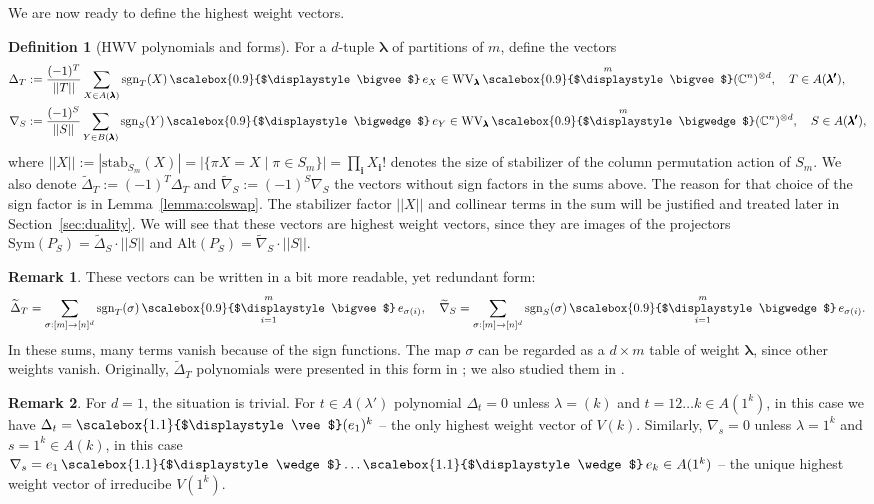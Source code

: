 \documentclass[12pt, reqno]{amsart}
\theoremstyle{definition}
\newtheorem{definition}[theorem]{Definition}
\newtheorem{remark}{Remark}[section]
\newcommand{\sgn}{\mathrm{sgn}}
\newcommand{\Deltaw}{\widetilde{\Delta}}
\newcommand{\nablaw}{\widetilde{\nabla}}
\let\oldbigwedge\bigwedge
\let\oldbigvee\bigvee
\let\oldwedge\wedge
\let\oldvee\vee
\renewcommand{\bigwedge}{
  \mathop{
    \vcenter{
      \hbox{\scalebox{0.9}{$\displaystyle\oldbigwedge$}}
    }
  }
}
\renewcommand{\bigvee}{
  \mathop{
    \vcenter{
      \hbox{\scalebox{0.9}{$\displaystyle\oldbigvee$}}
    }
  }
}
\renewcommand{\wedge}{
  \mathop{
    \vcenter{
      \hbox{\scalebox{1.1}{$\displaystyle\oldwedge$}}
    }
  }
}
\renewcommand{\vee}{
  \mathop{
    \vcenter{
      \hbox{\scalebox{1.1}{$\displaystyle\oldvee$}}
    }
  }
}
\begin{document}
We are now ready to define the highest weight vectors.

\begin{definition}[HWV polynomials and forms]\label{def:nabla-delta1}
    For a $d$-tuple $\pmb{\lambda}$ of partitions of $m$,
    define the vectors
    \begin{align} 
        \Delta_T &:= \frac{(-1)^T}{||T||}\sum_{X \in A(\pmb{\lambda})} \sgn_T(X) \bigvee e_X
        \in \mathrm{WV}_{\pmb{\lambda}} \bigvee^m (\mathbb{C}^n)^{\otimes d}, \quad T \in A(\pmb{\lambda'}), \label{eq:def-delta}
        \\  
        \nabla_S &:= \frac{(-1)^S}{||S||}\sum_{Y \in B(\pmb{\lambda})} \sgn_S(Y) \bigwedge e_Y 
        \in \mathrm{WV}_{\pmb{\lambda}} \bigwedge^m (\mathbb{C}^n)^{\otimes d}, \quad S \in A(\pmb{\lambda'}) \label{eq:def-nabla},
    \end{align}
    where $||X||:=|\mathrm{stab}_{S_m}(X)| = |\{\pi X = X \mid \pi \in S_m\}| = \prod_{\mathbf{i}}X_{\mathbf{i}}!$ denotes the size of stabilizer of the column permutation action of $S_m$.
    We also denote $\Deltaw_T := (-1)^T \Delta_T$ and $\nablaw_S := (-1)^S \nabla_S$ the vectors without sign factors in the sums above. The reason for that choice of the sign factor is in  Lemma~\ref{lemma:colswap}.
    The stabilizer factor $||X||$ and collinear terms in the sum will be justified and treated later in Section~\ref{sec:duality}.
    We will see that these vectors are highest weight vectors, since they are images of the projectors $\mathrm{Sym}(P_S) = \Deltaw_S \cdot ||S||$ and $\mathrm{Alt}(P_S) = \nablaw_S \cdot ||S||$.
\end{definition}
\begin{remark}
    These vectors can be written in a bit more readable, yet redundant form:
    \begin{align*}
        \Deltaw_T = \sum_{\sigma: [m] \to [n]^d} \sgn_T(\sigma) \bigvee_{i=1}^m e_{\sigma(i)}, 
        \quad 
        \nablaw_S = \sum_{\sigma: [m] \to [n]^d} \sgn_S(\sigma) \bigwedge_{i=1}^m e_{\sigma(i)}.
    \end{align*}
    In these sums, many terms vanish because of the sign functions. The map $\sigma$ can be regarded as a $d \times m$ table of weight $\pmb{\lambda}$, since other weights vanish. Originally, $\Deltaw_T$ polynomials were presented in this form in \cite{widg1}; we also studied them in \cite{ayfund}. 
\end{remark}
\begin{remark}
    For $d = 1$, the situation is trivial. For $t \in A(\lambda')$ polynomial $\Delta_{t} = 0$ unless $\lambda = (k)$ and $t = 12\ldots k \in A(1^k)$, in this case we have $\Delta_t = \vee (e_1)^k$ -- the only highest weight vector of $V(k)$. Similarly, $\nabla_s = 0$ unless $\lambda = 1^k$ and $s = 1^k \in A(k)$, in this case $\nabla_s = e_1 \wedge \ldots \wedge e_k \in A(1^k)$ -- the unique highest weight vector of irreducibe $V(1^k)$.
\end{remark}
\end{document}

